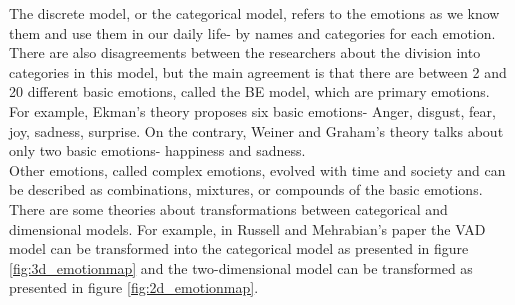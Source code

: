 \documentclass[../main.tex]{subfiles}
\begin{document}
The discrete model, or the categorical model, refers to the emotions as we know them and use 
them in our daily life- by names and categories for each emotion. 
There are also disagreements between the researchers about the division into categories in this model, 
but the main agreement is that there are between 2 and 20 different basic emotions, called the BE model,
which are primary emotions. For example, Ekman's theory \cite{Ekman_Theory} proposes 
six basic emotions- Anger, disgust, fear, joy, sadness, surprise. 
On the contrary, Weiner and Graham's \cite{WG-Theory} theory talks about only two basic emotions- happiness and sadness.\\
Other emotions, called complex emotions, evolved with time and society and can 
be described as combinations, mixtures, or compounds of the basic emotions.
There are some theories about transformations between categorical and dimensional models. 
For example, in Russell and Mehrabian's paper \cite{VAD_model} the VAD model can 
be transformed into the categorical model as presented in figure \ref{fig:3d_emotionmap}
and the two-dimensional model can be transformed as presented in figure \ref{fig:2d_emotionmap}.
\end{document}

